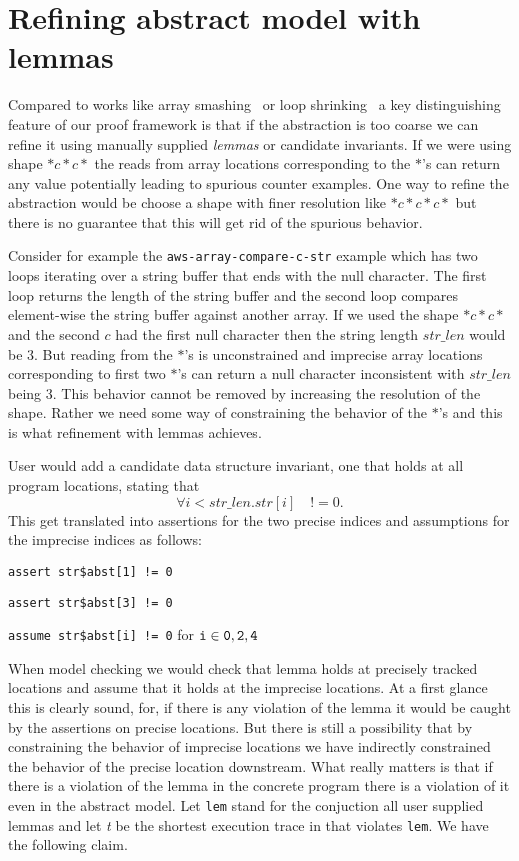 \section{Refining abstract model with lemmas}

Compared to works like array smashing~\cite{} or loop
shrinking~\cite{loopshrink} a key distinguishing feature of our proof
framework is that if the abstraction is too coarse we can refine it
using manually supplied \emph{lemmas} or candidate invariants. If we
were using shape \(*c*c*\) the reads from array locations
corresponding to the \(*\)'s can return any value potentially leading to
spurious counter examples. One way to refine the abstraction would be
choose a shape with finer resolution like \(*c*c*c*\) but there is no
guarantee that this will get rid of the spurious behavior.

Consider for example the {\tt aws-array-compare-c-str} example which
has two loops iterating over a string buffer that ends with the null
character. The first loop returns the length of the string buffer and
the second loop compares element-wise the string buffer against
another array. If we used the shape \(*c*c*\) and the second \(c\) had
the first null character then the string length \(str\_len\) would be
\(3\). But reading from the \(*\)'s is unconstrained and imprecise
array locations corresponding to first two \(*\)'s can return a null
character inconsistent with \(str\_len\) being 3. This behavior cannot
be removed by increasing the resolution of the shape. Rather we need
some way of constraining the behavior of the \(*\)'s and this is what
refinement with lemmas achieves.

User would add a candidate data structure invariant, one that holds at
all program locations, stating that \[\forall i < str\_len.str[i]
\quad != 0.\] This get translated into assertions for the two precise
indices and assumptions for the imprecise indices as follows:

{\tt assert str\$abst[1] != 0}

{\tt assert str\$abst[3] != 0}


{\tt assume str\$abst[i] != 0} for \({\tt i} \in {\tt 0,2,4}\)

When model checking \progabst{} we would check that lemma holds at
precisely tracked locations and assume that it holds at the imprecise
locations. At a first glance this is clearly sound, for, if there is
any violation of the lemma it would be caught by the assertions
on precise locations. But there is still a possibility that by constraining the
behavior of imprecise locations we have indirectly constrained the
behavior of the precise location downstream. What really matters is
that if there is a violation of the lemma in the concrete program
there is a violation of it even in the
abstract model. Let {\tt lem} stand for the conjuction all user
supplied lemmas and let \emph{t} be the shortest execution trace
in \prog{} that violates {\tt lem}. We have the following claim.

